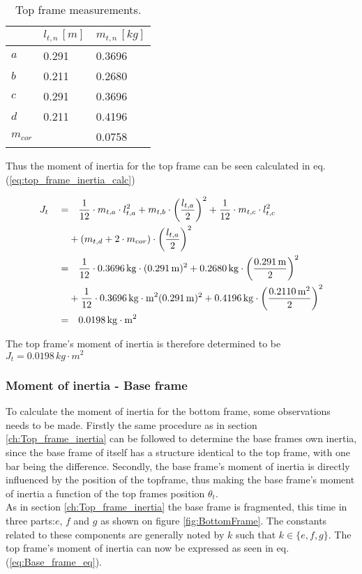 \documentclass[../../main]{subfiles}
\begin{document}
\begin{table}[H]
\centering
\begin{tabular}{|l|l|l|}
\hline
  & $l_{t,n} \, \si{[m]}$ & $m_{t,n} \, \si{[kg]}$ \\
\hline
$a$ & 0.291  & 0.3696  \\
\hline
$b$ & 0.211  & 0.2680  \\
\hline
$c$ & 0.291 & 0.3696  \\
\hline
$d$ & 0.211 & 0.4196  \\
\hline
$m_{cor}$ & & 0.0758 \\
\hline
\end{tabular}
\caption{Top frame measurements.}
    \label{tab:Top_frame_table}
\end{table}

Thus the moment of inertia for the top frame can be seen calculated in eq. (\ref{eq:top_frame_inertia_calc})

\begin{equation}
  \centering
    \label{eq:top_frame_inertia_calc}
  \begin{split}
      J_t  \quad  =&  \quad \frac{1}{12} \cdot m_{t,a} \cdot l_{t,a}^2 + m_{t,b} \cdot \left(\frac{l_{t,a}}{2}\right)^2 + \frac{1}{12} \cdot m_{t,c}\cdot l_{t,c}^2\\
      &+ (m_{t,d} + 2 \cdot m_{cor}) \cdot \left( \frac{l_{t,a}}{2}\right)^2 \\
      =& \quad \frac{1}{12} \cdot 0.3696 \si{\,kg}  \cdot (0.291 \si{\,m})^2
      + 0.2680 \si{\,kg} \cdot \left(\frac{0.291 \si{\,m}}{2}\right)^2 \\
      &+ \frac{1}{12} \cdot 0.3696 \si{\,kg\cdot m^2} (0.291 \si{\,m})^2
      + 0.4196 \si{\,kg} \cdot \left( \frac{0.2110\si{\,m}^2}{2} \right)^2 \\
      =& \quad 0.0198 \si{\,kg\cdot m^2}
  \end{split}
\end{equation}

The top frame's moment of inertia is therefore determined to be
\newline $J_{t} = 0.0198 \si{\,kg\cdot m^2}$

\subsubsection{Moment of inertia - Base frame}
To calculate the moment of inertia for the bottom frame, some observations needs to be made. Firstly the same procedure as in section \ref{ch:Top_frame_inertia} can be followed to determine the base frames own inertia, since the base frame of itself has a structure identical to the top frame, with one bar being the difference. Secondly, the base frame's moment of inertia is directly influenced by the position of the topframe, thus making the base frame's moment of inertia a function of the top frames position $\theta_t$.\\
As in section \ref{ch:Top_frame_inertia} the base frame is fragmented, this time in three parts:$e$, $f$ and $g$ as shown on figure \ref{fig:BottomFrame}. The constants related to these components are generally noted by $k$ such that $k \in \{e,f,g\}$. The top frame's moment of inertia can now be expressed as seen in eq. (\ref{eq:Base_frame_eq}).
\end{document}
